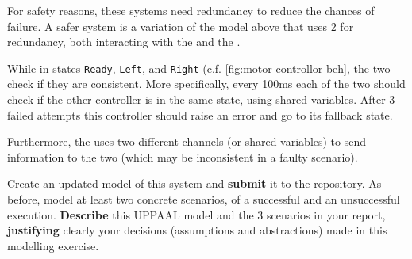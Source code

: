 \documentclass[11pt]{article}
\begin{document}
\begin{myExercise} \label{ex:model2}
For safety reasons, these systems need redundancy to reduce the chances of failure.
A safer system is a variation of the model above that
uses 2  for redundancy, both interacting with the  and the .

While in states \texttt{Ready}, \texttt{Left}, and \texttt{Right} (c.f. \cref{fig:motor-controllor-beh}, the two  check if they are consistent. More specifically, every 100ms each of the two  should check if the other controller is in the same state, using shared variables. After 3 failed attempts this controller should raise an error and go to its fallback state.

Furthermore, the  uses two different channels (or shared variables) to send information to the two  (which may be inconsistent in a faulty scenario).


Create an updated model of this system and \textbf{submit} it to the repository.
%
As before, model at least two concrete scenarios, of a successful and an unsuccessful execution.
\textbf{Describe} this UPPAAL model and the 3 scenarios in your report,
\textbf{justifying} clearly your decisions (assumptions and abstractions) made in this modelling exercise.
\end{myExercise}
\end{document}
